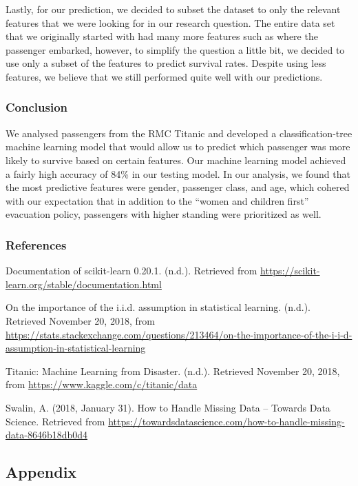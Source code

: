\documentclass[]{article}
\begin{document}
Lastly, for our prediction, we decided to subset the dataset to only the
relevant features that we were looking for in our research question. The
entire data set that we originally started with had many more features
such as where the passenger embarked, however, to simplify the question
a little bit, we decided to use only a subset of the features to predict
survival rates. Despite using less features, we believe that we still
performed quite well with our predictions.

\subsubsection{Conclusion}\label{conclusion}

We analysed passengers from the RMC Titanic and developed a
classification-tree machine learning model that would allow us to
predict which passenger was more likely to survive based on certain
features. Our machine learning model achieved a fairly high accuracy of
84\% in our testing model. In our analysis, we found that the most
predictive features were gender, passenger class, and age, which cohered
with our expectation that in addition to the ``women and children
first'' evacuation policy, passengers with higher standing were
prioritized as well.

\newpage

\subsubsection{References}\label{references}

Documentation of scikit-learn 0.20.1. (n.d.). Retrieved from
\url{https://scikit-learn.org/stable/documentation.html}

On the importance of the i.i.d. assumption in statistical learning.
(n.d.). Retrieved November 20, 2018, from
\url{https://stats.stackexchange.com/questions/213464/on-the-importance-of-the-i-i-d-assumption-in-statistical-learning}

Titanic: Machine Learning from Disaster. (n.d.). Retrieved November 20,
2018, from \url{https://www.kaggle.com/c/titanic/data}

Swalin, A. (2018, January 31). How to Handle Missing Data -- Towards
Data Science. Retrieved from
\url{https://towardsdatascience.com/how-to-handle-missing-data-8646b18db0d4}

\newpage

\subsection{Appendix}\label{appendix}
\end{document}
